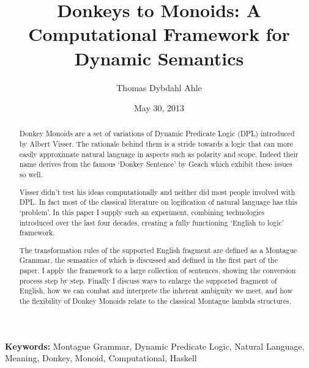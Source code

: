 \documentclass[12pt]{article}
\title{Donkeys to Monoids: A Computational Framework for Dynamic Semantics}
\author{Thomas Dybdahl Ahle}
\date{May 30, 2013}
\begin{document}
\maketitle

\begin{abstract}


Donkey Monoids are a set of variations of Dynamic Predicate Logic (DPL) introduced by Albert Visser. The rationale behind them is a stride towards a logic that can more easily approximate natural language in aspects such as polarity and scope. Indeed their name derives from the famous `Donkey Sentence' by Geach\cite{geach1962reference} which exhibit these issues so well.

Visser didn't test his ideas computationally and neither did most people involved with DPL. In fact most of the classical literature on logification of natural language has this `problem'. In this paper I supply such an experiment, combining technologies introduced over the last four decades, creating a fully functioning `English to logic' framework.

The transformation rules of the supported English fragment are defined as a Montague Grammar, the semantics of which is discussed and defined in the first part of the paper. I apply the framework to a large collection of sentences, showing the conversion process step by step. Finally I discuss ways to enlarge the supported fragment of English, how we can combat and interprete the inherent ambiguity we meet, and how the flexibility of Donkey Monoids relate to the classical Montague lambda structures.

\end{abstract}

\smallskip\smallskip
\noindent \small{\textbf{Keywords:} Montague Grammar, Dynamic Predicate Logic, Natural Language, Meaning, Donkey, Monoid, Computational, Haskell}
\end{document}
